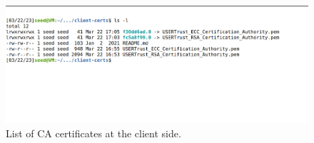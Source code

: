 \begin{figure}[h]
    \centering
    \includegraphics[width=\textwidth,height=\textheight,keepaspectratio]
    {figures/list_of_client_cert.png}
    \caption{List of CA certificates at the client side.}
    \label{fig:ca_cert_client}
\end{figure}

